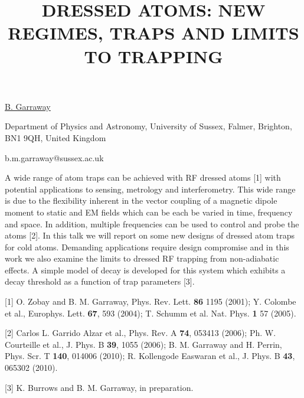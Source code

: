 \title{DRESSED ATOMS: NEW REGIMES, TRAPS AND LIMITS TO TRAPPING}

\underline{B. Garraway} 

{\normalsize{\vspace{-4mm}
Department of Physics and Astronomy, University of Sussex, Falmer,
Brighton, BN1 9QH, United Kingdom

\email b.m.garraway@sussex.ac.uk}}

A wide range of atom traps can be achieved with RF dressed atoms [1]
with potential applications to sensing, metrology and interferometry.
This wide range is due to the flexibility inherent in the vector
coupling of a magnetic dipole moment to static and EM fields which can
be each be varied in time, frequency and space. In addition, multiple
frequencies can be used to control and probe the atoms [2]. In this
talk we will report on some new designs of dressed atom traps for cold
atoms. Demanding applications require design compromise and in this
work we also examine the limits to dressed RF trapping from
non-adiabatic effects. A simple model of decay is developed for this
system which exhibits a decay threshold as a function of trap
parameters [3].

{\normalsize
[1] O. Zobay and B. M. Garraway, Phys. Rev. Lett. \textbf{86} 1195 (2001);
Y. Colombe et al., Europhys. Lett. \textbf{67}, 593 (2004);
T. Schumm et al. Nat. Phys. \textbf{1} 57 (2005).
\vsp

[2] Carlos L. Garrido Alzar et al., Phys. Rev. A \textbf{74}, 053413 (2006);
Ph. W. Courteille et al., J. Phys. B \textbf{39}, 1055 (2006);
B. M. Garraway and H. Perrin, Phys. Scr. T \textbf{140}, 014006 (2010);
R. Kollengode Easwaran et al., J. Phys. B \textbf{43}, 065302 (2010).
\vsp

[3] K. Burrows and B. M. Garraway, in preparation.
}

\vspace{\baselineskip} 